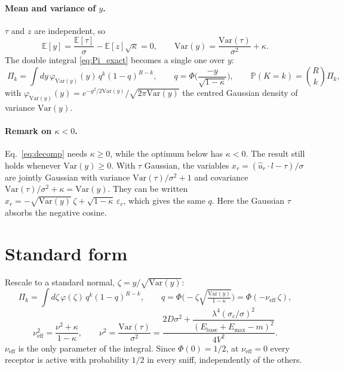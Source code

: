 \documentclass[11pt,a4paper]{article}
\newcommand{\EE}{\mathbb{E}}
\newcommand{\PP}{\mathbb{P}}
\newcommand{\Var}{\mathrm{Var}}
\newcommand{\Ebase}{E_{\mathrm{base}}}
\newcommand{\Emax}{E_{\mathrm{max}}}
\newcommand{\uhat}{\hat{u}}
\newcommand{\nueff}{\nu_{\mathrm{eff}}}
\begin{document}
\paragraph{Mean and variance of $y$.} $\tau$ and $z$ are independent, so
\begin{equation}
  \EE[y]=\frac{\EE[\tau]}{\sigma}-\EE[z]\sqrt\kappa=0,
  \qquad
  \Var(y)=\frac{\Var(\tau)}{\sigma^2}+\kappa .
\end{equation}
The double integral \eqref{eq:Pi_exact} becomes a single one over $y$:
\begin{equation}
  \boxed{\;\Pi_k=\int dy\,\varphi_{\Var(y)}(y)\,q^k(1-q)^{R-k},
  \qquad
  q=\Phi\Big(\frac{-y}{\sqrt{1-\kappa}}\Big),
  \qquad
  \PP(K=k)=\binom Rk\Pi_k ,\;}
\end{equation}
with $\varphi_{\Var(y)}(y)=e^{-y^2/2\Var(y)}/\sqrt{2\pi\Var(y)}$ the centred Gaussian
density of variance $\Var(y)$.

\paragraph{Remark on $\kappa<0$.} Eq.~\eqref{eq:decomp} needs $\kappa\ge0$, while the optimum
below has $\kappa<0$. The result still holds whenever $\Var(y)\ge0$. With $\tau$ Gaussian,
the variables $x_r=(\uhat_r\cdot l-\tau)/\sigma$ are jointly Gaussian with variance
$\Var(\tau)/\sigma^2+1$ and covariance $\Var(\tau)/\sigma^2+\kappa=\Var(y)$. They can be
written $x_r=-\sqrt{\Var(y)}\,\zeta+\sqrt{1-\kappa}\,\varepsilon_r$, which gives the same
$q$. Here the Gaussian $\tau$ absorbs the negative cosine.

\section{Standard form}

Rescale to a standard normal, $\zeta=y/\sqrt{\Var(y)}$:
\begin{equation}
  \boxed{\;\Pi_k=\int d\zeta\,\varphi(\zeta)\,q^k(1-q)^{R-k},
  \qquad
  q=\Phi\Big(-\zeta\sqrt{\tfrac{\Var(y)}{1-\kappa}}\Big)=\Phi(-\nueff\,\zeta),\;}
  \label{eq:Pi}
\end{equation}
\begin{equation}
  \nueff^2=\frac{\nu^2+\kappa}{1-\kappa},
  \qquad
  \nu^2=\frac{\Var(\tau)}{\sigma^2}
  =\frac{2D\sigma^2+\dfrac{\lambda^4(\sigma_c/\sigma)^2}{(\Ebase+\Emax-m)^2}}{4V^2}.
  \label{eq:nueff}
\end{equation}
$\nueff$ is the only parameter of the integral. Since $\Phi(0)=1/2$, at $\nueff=0$ every
receptor is active with probability $1/2$ in every sniff, independently of the others.
\end{document}
